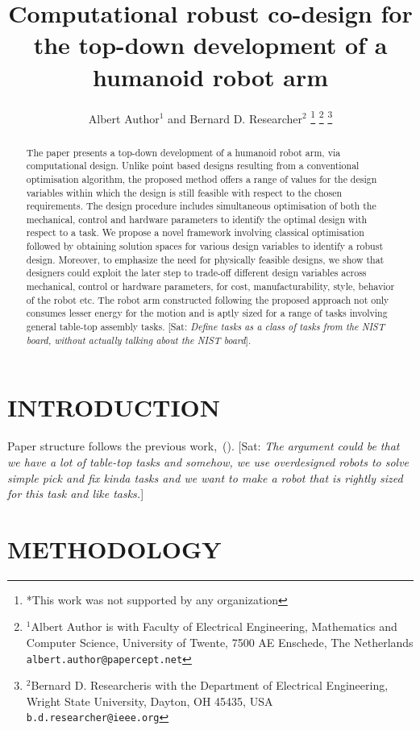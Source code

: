 \documentclass[letterpaper, 10 pt, conference]{ieeeconf}  %
\title{\LARGE \bf
Computational robust co-design for the top-down development of a humanoid robot arm \\
\asc{Started: 07-06-2022}
}
\author{Albert Author$^{1}$ and Bernard D. Researcher$^{2}$%
\thanks{*This work was not supported by any organization}%
\thanks{$^{1}$Albert Author is with Faculty of Electrical Engineering, Mathematics and Computer Science,
        University of Twente, 7500 AE Enschede, The Netherlands
        {\tt\small albert.author@papercept.net}}%
\thanks{$^{2}$Bernard D. Researcheris with the Department of Electrical Engineering, Wright State University,
        Dayton, OH 45435, USA
        {\tt\small b.d.researcher@ieee.org}}%
}
\newcommand{\asc}[1]{{\color{blue!50!black} [Sat: {\em #1}]}\xspace}
\newcommand{\mcite}[1]{\cite{#1}\textrm{\color{blue}(\texttt{\detokenize{#1}})}}
\begin{document}
\maketitle
\thispagestyle{empty}
\pagestyle{empty}


\begin{abstract}
The paper presents a top-down development of a humanoid robot arm, via computational design. Unlike point based designs resulting from a conventional optimisation algorithm, the proposed method offers a range of values for the design variables within which the design is still feasible with respect to the chosen requirements. The design procedure includes simultaneous optimisation of both the mechanical, control  and hardware parameters to identify the optimal design with respect to a task. We propose a novel framework involving classical optimisation followed by obtaining solution spaces for various design variables to identify a robust design. Moreover, to emphasize the need for physically feasible designs, we show that designers could exploit the later step to trade-off different design variables across mechanical, control or hardware parameters, for cost, manufacturability, style, behavior of the robot etc. The robot arm constructed following the proposed approach not only consumes lesser energy for the motion and is aptly sized for a range of tasks involving general table-top assembly tasks. \asc{Define tasks as a class of tasks from the NIST board, without actually talking about the NIST board}. 
\end{abstract}


\section{INTRODUCTION}
Paper structure follows the previous work,~\mcite{fadini_computational_2021}.
\asc{The argument could be that we have a lot of table-top tasks and somehow, we use overdesigned robots to solve simple pick and fix kinda tasks and we want to make a robot that is rightly sized for this task and like tasks.}

\section{METHODOLOGY}
\end{document}
